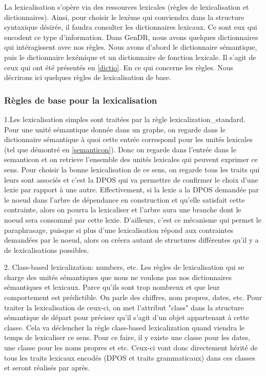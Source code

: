 La lexicalisation s'opère via des ressources lexicales (règles de lexicalisation et dictionnaires). Ainsi, pour choisir le lexème qui conviendra dans la structure syntaxique désirée, il faudra consulter les dictionnaires lexicaux. Ce sont eux qui encodent ce type d'information. Dans GenDR, nous avons quelques dictionnaires qui intéragissent avec nos règles. Nous avons d'abord le dictionnaire sémantique, puis le dictionnaire lexémique et un dictionnaire de fonction lexicale. Il s'agit de ceux qui ont été présentés en \ref{dictio}. En ce qui concerne les règles. Nous décrirons ici quelques règles de lexicalisation de base.

\subsubsection{Règles de base pour la lexicalisation}

1.Les lexicalisation simples sont traitées par la règle lexicalization\_standard. Pour une unité sémantique donnée dans un graphe, on regarde dans le dictionnaire sémantique à quoi cette entrée correspond pour les unités lexicales (tel que démontré en \ref{semanticon}). Donc on regarde dans l'entrée dans le semanticon et on retrieve l'ensemble des unités lexicales qui peuvent exprimer ce sens. Pour choisir la bonne lexicalisation de ce sens, on regarde tous les traits qui leurs sont associés et c'est la DPOS qui va permettre de confirmer le choix d'une lexie par rapport à une autre. Effectivement, si la lexie a la DPOS demandée par le noeud dans l'arbre de dépendance en construction et qu'elle satisfait cette contrainte, alors on pourra la lexicaliser et l'arbre aura une branche dont le noeud sera consommé par cette lexie. D'ailleurs, c'est ce mécanisme qui permet le paraphrasage, puisque si plus d'une lexicalisation répond aux contraintes demandées par le noeud, alors on créera autant de structures différentes qu'il y a de lexicalisations possibles. 

2. Class-based lexicalization: numbers, etc. Les règles de lexicalisation qui se charge des unités sémantiques que nous ne voulons pas nos dictionnaires sémantiques et lexicaux.  Parce qu'ils sont trop nombreux et que leur comportement est prédictible. On parle des chiffres, nom propres, dates, etc. Pour traiter la lexicalisation de ceux-ci, on met l'attribut "class" dans la structure sémantique de départ pour préciser qu'il s'agit d'un objet appartenant à cette classe. Cela va déclencher la règle class-based lexicalization quand viendra le temps de lexicaliser ce sens. Pour ce faire, il y existe une classe pour les dates, une classe pour les noms propres et etc. Ceux-ci vont donc directement hérité de tous les traits lexicaux encodés (DPOS et traits grammaticaux) dans ces classes et seront réalisés par après. 

